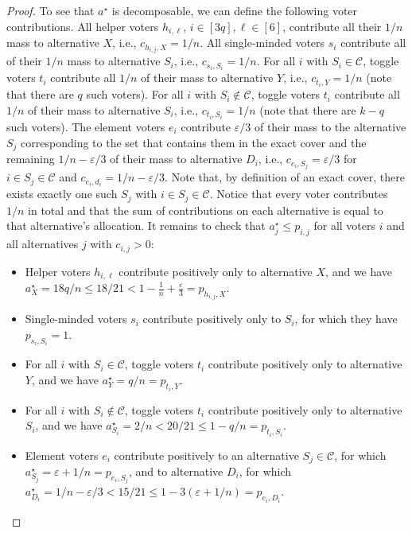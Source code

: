\documentclass[11pt]{article}
\begin{document}
\begin{proof}
To see that $a^\star$ is decomposable, we can define the following voter contributions. All helper voters $h_{i,\ell}$, $i \in [3q], \ell \in [6]$, contribute all their $1/n$ mass to alternative $X$, i.e., $c_{h_{i,j},X}=1/n$. All single-minded voters $s_i$ contribute all of their $1/n$ mass to alternative $S_i$, i.e., $c_{s_i,S_i}=1/n$. For all $i$ with $S_i \in \mathcal{C}$, toggle voters $t_i$ contribute all $1/n$ of their mass to alternative $Y$, i.e., $c_{t_i,Y}=1/n$ (note that there are $q$ such voters). For all $i$ with $S_i \not \in \mathcal{C}$, toggle voters $t_i$ contribute all $1/n$ of their mass to alternative $S_i$, i.e., $c_{t_i, S_i}=1/n$ (note that there are $k-q$ such voters). The element voters $e_i$ contribute $\varepsilon/3$ of their mass to the alternative $S_j$ corresponding to the set that contains them in the exact cover and the remaining $1/n-\varepsilon/3$ of their mass to alternative $D_i$, i.e., $c_{e_i,S_j}=\varepsilon/3$ for $i \in S_j \in \mathcal{C}$ and $c_{e_i,d_i}=1/n-\varepsilon/3$. Note that, by definition of an exact cover, there exists exactly one such $S_j$ with $i \in S_j \in \mathcal{C}$. Notice that every voter contributes $1/n$ in total and that the sum of contributions on each alternative is equal to that alternative's allocation. It remains to check that $a^\star_j \le p_{i,j}$ for all voters $i$ and all alternatives $j$ with $c_{i,j}>0$:
\begin{itemize}
    \item Helper voters $h_{i,\ell}$ contribute positively only to alternative $X$, and we have $a^\star_X = 18q/n \le 18/21 < 1-\frac{1}{n}+\frac{\varepsilon}{3}=p_{h_{i,j},X}$.
    \item Single-minded voters $s_i$ contribute positively only to $S_i$, for which they have $p_{s_i,S_i}=1$.
    \item For all $i$ with $S_i \in \mathcal{C}$, toggle voters $t_i$ contribute positively only to alternative $Y$, and we have $a^\star_Y = q/n =p_{t_i,Y}$.
    \item For all $i$ with $S_i \not \in \mathcal{C}$, toggle voters $t_i$ contribute positively only to alternative $S_i$, and we have $a^\star_{S_i} = 2/n < 20/21 \le 1-q/n = p_{t_i,S_i}$.
    \item Element voters $e_i$ contribute positively to an alternative $S_j \in \mathcal{C}$, for which $a^\star_{S_j}=\varepsilon+1/n=p_{e_i,S_j}$, and to alternative $D_i$, for which $a^\star_{D_i} = 1/n-\varepsilon/3 <15/21 \le 1-3(\varepsilon+1/n) = p_{e_i,D_i}$.
\end{itemize}


\end{proof}
\end{document}
